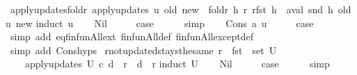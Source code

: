 \begin{isabellebody}
\isanewline
{}\isamarkupfalse%
\ apply{\isacharunderscore}updates{\isacharunderscore}foldr{\isacharcolon}\ {\isachardoublequoteopen}apply{\isacharunderscore}updates\ u\ old\ new\ {\isacharequal}\ foldr\ {\isacharparenleft}{\isasymlambda}h\ r{\isachardot}\ r{\isacharparenleft}fst\ h\ {\isachardollar}{\isacharcolon}{\isacharequal}\ aval\ {\isacharparenleft}snd\ h{\isacharparenright}\ old{\isacharparenright}{\isacharparenright}\ u\ new{\isachardoublequoteclose}\isanewline
%
\isadelimproof
%
\endisadelimproof
%
\isatagproof
{}\isamarkupfalse%
{\isacharparenleft}induct\ u{\isacharparenright}\isanewline
\ \ \isamarkupfalse%
\ Nil\isanewline
\ \ \isamarkupfalse%
\ \isamarkupfalse%
\ {\isacharquery}case\isanewline
\ \ \ \ \isamarkupfalse%
\ simp\isanewline
{}\isamarkupfalse%
\isanewline
\ \ \isamarkupfalse%
\ {\isacharparenleft}Cons\ a\ u{\isacharparenright}\isanewline
\ \ \isamarkupfalse%
\ \isamarkupfalse%
\ {\isacharquery}case\isanewline
\ \ \ \ \isamarkupfalse%
\ {\isacharparenleft}simp\ add{\isacharcolon}\ eq{\isacharunderscore}finfun{\isacharunderscore}All{\isacharunderscore}ext\ finfun{\isacharunderscore}All{\isacharunderscore}def\ finfun{\isacharunderscore}All{\isacharunderscore}except{\isacharunderscore}def{\isacharparenright}\isanewline
\ \ \ \ \isamarkupfalse%
\ {\isacharparenleft}simp\ add{\isacharcolon}\ Cons{\isachardot}hyps{\isacharparenright}\isanewline
{}\isamarkupfalse%
%
\endisatagproof
{\isafoldproof}%
%
\isadelimproof
\isanewline
%
\endisadelimproof
\isanewline
{}\isamarkupfalse%
\ r{\isacharunderscore}not{\isacharunderscore}updated{\isacharunderscore}stays{\isacharunderscore}the{\isacharunderscore}same{\isacharcolon}\ {\isachardoublequoteopen}r\ {\isasymnotin}\ fst\ {\isacharbackquote}\ set\ U\ {\isasymLongrightarrow}\isanewline
\ \ \ \ apply{\isacharunderscore}updates\ U\ c\ d\ {\isachardollar}\ r\ {\isacharequal}\ d\ {\isachardollar}\ r{\isachardoublequoteclose}\isanewline
%
\isadelimproof
%
\endisadelimproof
%
\isatagproof
{}\isamarkupfalse%
{\isacharparenleft}induct\ U{\isacharparenright}\isanewline
\ \ \isamarkupfalse%
\ Nil\isanewline
\ \ \isamarkupfalse%
\ \isamarkupfalse%
\ {\isacharquery}case\isanewline
\ \ \ \ \isamarkupfalse%
\ simp\isanewline
{}\isamarkupfalse%
\isanewline
\ \ \isamarkupfalse%

\end{isabellebody}
